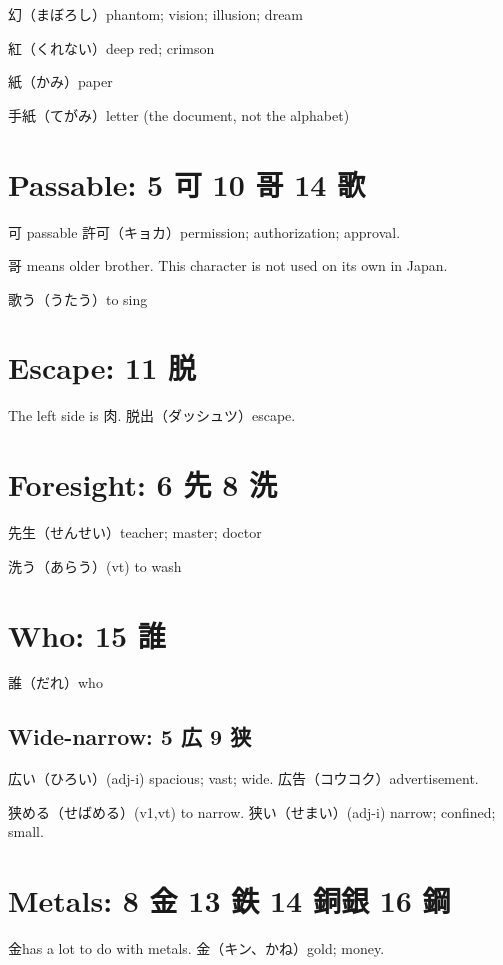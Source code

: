 幻（まぼろし）phantom; vision; illusion; dream

紅（くれない）deep red; crimson

紙（かみ）paper

手紙（てがみ）letter (the document, not the alphabet)

\section{Passable: 5 可 10 哥 14 歌}

可 passable
許可（キョカ）permission; authorization; approval.

哥 means older brother.
This character is not used on its own in Japan.

歌う（うたう）to sing

\section{Escape: 11 脱}

The left side is 肉.
脱出（ダッシュツ）escape.

\section{Foresight: 6 先 8 洗}

先生（せんせい）teacher; master; doctor

洗う（あらう）(vt) to wash

\section{Who: 15 誰}

誰（だれ）who

\subsection{Wide-narrow: 5 広 9 狭}

広い（ひろい）(adj-i) spacious; vast; wide.
広告（コウコク）advertisement.

狭める（せばめる）(v1,vt) to narrow.
狭い（せまい）(adj-i) narrow; confined; small.

\section{Metals: 8 金 13 鉄 14 銅銀 16 鋼}

金has a lot to do with metals.
金（キン、かね）gold; money.

